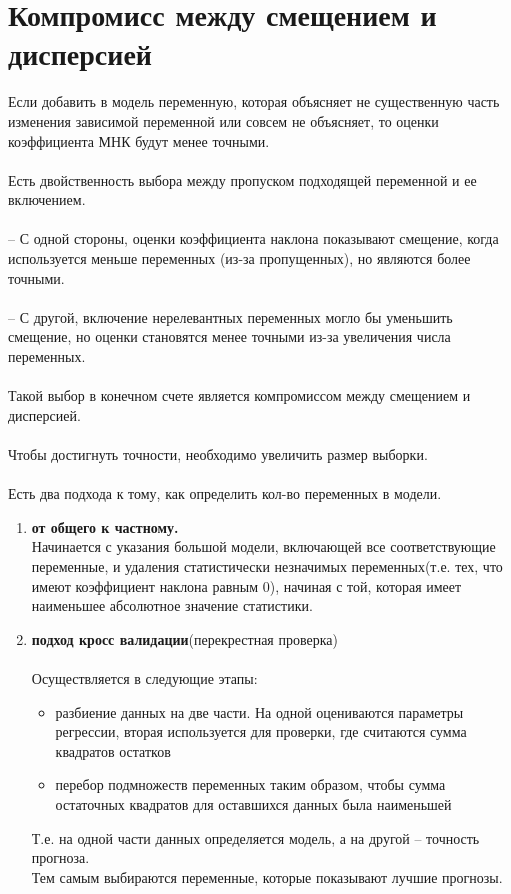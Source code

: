 \documentclass{article}
\begin{document}
	
	\section{Компромисс между смещением и дисперсией}
	Если добавить в модель переменную, которая объясняет не существенную часть изменения зависимой переменной или совсем не объясняет, то оценки коэффициента МНК будут менее точными.\\
	\\
	Есть двойственность выбора между пропуском подходящей переменной и ее включением.
	\\
	\\
	-- С одной стороны, оценки коэффициента наклона показывают смещение, когда используется меньше переменных (из-за пропущенных), но являются более точными.\\
	\\
	-- С другой, включение нерелевантных переменных могло бы уменьшить смещение, но оценки становятся менее точными из-за увеличения числа переменных.
	\\
	\\
	Такой выбор в конечном счете является компромиссом между смещением и дисперсией.
	\\
	\\
	Чтобы достигнуть точности, необходимо увеличить размер выборки.
	\\
	\\
	Есть два подхода к тому, как определить кол-во переменных в модели.
	\begin{enumerate}
		\item\textbf{от общего к частному.}
		\\
		Начинается с указания большой модели, включающей все соответствующие переменные, и удаления статистически незначимых переменных(т.е. тех, что имеют коэффициент наклона равным 0), начиная с той, которая имеет наименьшее абсолютное значение статистики. 
		\\
		\item\textbf{подход кросс валидации}(перекрестная проверка)
		\\
		\\
		Осуществляется в следующие этапы:
		\begin{itemize}
			\item разбиение данных на две части. На одной оцениваются параметры регрессии, вторая используется для проверки, где считаются сумма квадратов остатков
			\item перебор подмножеств переменных таким образом, чтобы сумма остаточных квадратов для оставшихся данных была наименьшей
		\end{itemize}
		Т.е. на одной части данных определяется модель, а на другой – точность прогноза.
		\\
		Тем самым выбираются переменные, которые показывают лучшие прогнозы. 
	\end{enumerate}
	
\end{document}
